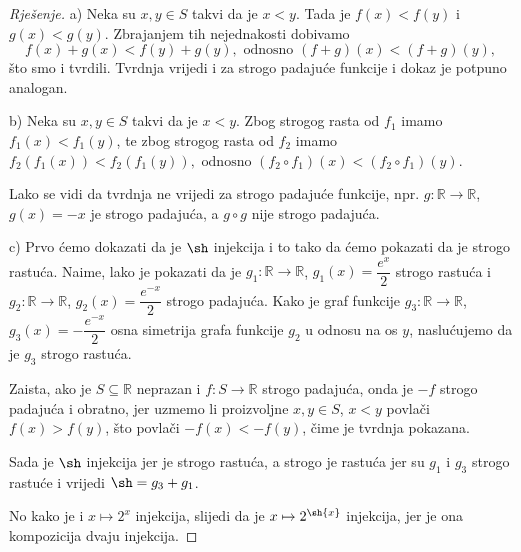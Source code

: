 \begin{proof}[Rješenje]
a) Neka su \(x, y\in S\) takvi da je \(x<y\). Tada je \(f(x)<f(y)\) i \(g(x)<g(y)\). Zbrajanjem tih nejednakosti dobivamo
\[f(x)+g(x)<f(y)+g(y),\text{ odnosno } (f+g)(x)<(f+g)(y),\]
što smo i tvrdili. Tvrdnja vrijedi i za strogo padajuće funkcije i dokaz je potpuno analogan.

b) Neka su \(x, y\in S\) takvi da je \(x<y\). Zbog strogog rasta od \(f_1\) imamo \(f_1(x)<f_1(y)\), te zbog strogog rasta od \(f_2\) imamo \(f_2\left(f_1(x)\right)<f_2\left(f_1(y)\right),\text{ odnosno } (f_2\circ f_1)(x)<(f_2\circ f_1)(y).\)

Lako se vidi da tvrdnja ne vrijedi za strogo padajuće funkcije, npr. \(g : \mathbb{R}\to \mathbb{R}\), \(g(x)=-x\) je strogo padajuća, a \(g\circ g\) nije strogo padajuća. 

c) Prvo ćemo dokazati da je \(\sh\) injekcija i to tako da ćemo pokazati da je strogo rastuća. Naime, lako je pokazati da je \(g_1 : \mathbb{R}\to \mathbb{R}\), \(g_1(x)=\dfrac{e^x}{2}\) strogo rastuća i \(g_2 : \mathbb{R}\to \mathbb{R}\), \(g_2(x)=\dfrac{e^{-x}}{2}\) strogo padajuća. Kako je graf funkcije \(g_3 : \mathbb{R}\to \mathbb{R}\), \(g_3(x)= -\dfrac{e^{-x}}{2}\) osna simetrija grafa funkcije \(g_2\) u odnosu na os \(y\), naslućujemo da je \(g_3\) strogo rastuća.

Zaista, ako je \(S\subseteq \mathbb{R}\) neprazan i \(f : S\to \mathbb{R}\) strogo padajuća, onda je \(-f\) strogo padajuća i obratno, jer uzmemo li proizvoljne \(x, y\in S\), \(x<y\) povlači \(f(x)>f(y)\), što povlači \(-f(x)<-f(y)\), čime je tvrdnja pokazana. 

Sada je \(\sh\) injekcija jer je strogo rastuća, a strogo je rastuća jer su \(g_1\) i \(g_3\) strogo rastuće i vrijedi \(\sh=g_3+g_1\). 

No kako je i \(x\mapsto 2^x\) injekcija, slijedi da je \(x\mapsto 2^{\sh{x}}\) injekcija, jer je ona kompozicija dvaju injekcija.
\end{proof}
